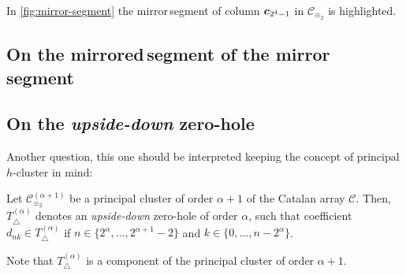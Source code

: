 
In \autoref{fig:mirror-segment} the \flqq mirror\frqq\,segment of column $\boldsymbol{c}_{2^{4}-1}$ 
in $\mathcal{C}_{\equiv_{2}}$ is highlighted.

\subsection{On the \flqq mirrored\frqq\,segment of the \flqq mirror\frqq\, segment}

\subsection{On the \emph{upside-down} zero-hole}

Another question, this one should be interpreted keeping the
concept of principal $h$-cluster in mind:
\begin{theorem}
    Let $\mathcal{C}_{\equiv_{2}}^{(\alpha+1)}$ be a principal cluster 
    of order $\alpha+1$ of the Catalan array $\mathcal{C}$. Then, 
    $T_{\bigtriangleup}^{({\alpha})}$ denotes an \emph{upside-down} zero-hole of order $\alpha$,
    such that coefficient $d_{nk}\in T_{\bigtriangleup}^{({\alpha})}$ if 
    $n\in\lbrace 2^{{\alpha}},\ldots,2^{{\alpha}+1}-2\rbrace$ and 
    $k\in\lbrace 0,\ldots, n-2^{{\alpha}}\rbrace$. \end{theorem}

Note that $T_{\bigtriangleup}^{({\alpha})}$ is a component of the principal cluster
    of order ${\alpha}+1$.

